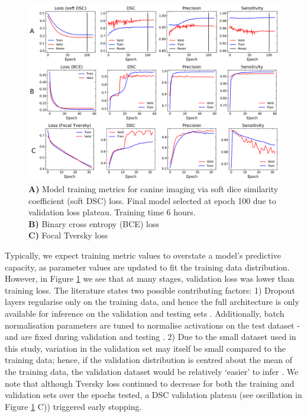 

\begin{figure}[H]
	\begin{center}
		\hspace*{-1.2cm}\includegraphics[width=1.15\textwidth]{figures/vacbag_metrics_combined}
		\caption{\textbf{A)} Model training metrics for canine imaging via soft dice similarity coefficient (soft DSC) loss. Final model selected at epoch 100 due to validation loss plateau. Training time 6 hours.\\
		\textbf{B)} Binary cross entropy (BCE) loss\\
		\textbf{C)} Focal Tversky loss}
		\label{fig:vet_metrics}
	\end{center}
\end{figure}

Typically, we expect training metric values to overstate a model's predictive capacity, as parameter values are updated to fit the training data distribution. However, in Figure \ref{fig:vet_metrics} we see that at many stages, validation loss was lower than training loss. The literature states two possible contributing factors: 1) Dropout layers regularise only on the training data, and hence the full architecture is only available for inference on the validation and testing sets \cite{srivastava2014}. Additionally, batch normalisation parameters are tuned to normalise activations on the test dataset - and are fixed during validation and testing \cite{santurkar2018}. 2) Due to the small dataset used in this study, variation in the validation set may itself be small compared to the training data; hence, if the validation distribution is centred about the mean of the training data, the validation dataset would be relatively `easier' to infer \cite{Bishop}. We note that although Tversky loss continued to decrease for both the training and validation sets over the epochs tested, a DSC validation plateau (see oscillation in Figure \ref{fig:vet_metrics} C)) triggered early stopping.

